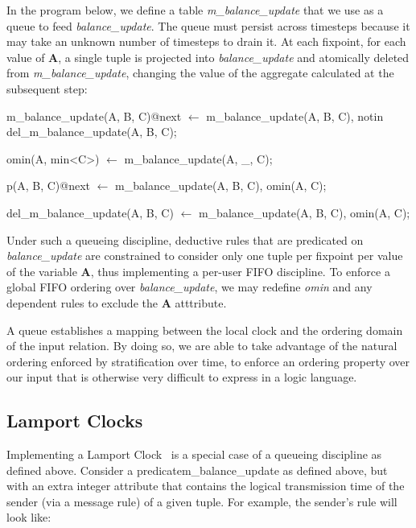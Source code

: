 In the program below, we define a table \emph{m\_balance\_update} that we use as a queue to feed \emph{balance\_update}.  The queue must persist across
timesteps because it may take an unknown number of timesteps to drain it.  At each fixpoint, for each value of \textbf{A}, a single
tuple is projected into \emph{balance\_update} and atomically deleted from \emph{m\_balance\_update}, changing the value of the aggregate calculated at the
subsequent step:


\begin{Dedalus}

m\_balance\_update(A, B, C)@next \(\leftarrow\)
  m\_balance\_update(A, B, C),
  notin del\_m\_balance\_update(A, B, C);

omin(A, min<C>) \(\leftarrow\)
  m\_balance_update(A, _, C);

p(A, B, C)@next \(\leftarrow\)
  m\_balance\_update(A, B, C),
  omin(A, C);

del\_m\_balance\_update(A, B, C) \(\leftarrow\)
  m\_balance\_update(A, B, C),
  omin(A, C);
\end{Dedalus}

Under such a queueing discipline, deductive rules that are predicated on \emph{balance\_update} are constrained to consider only one tuple per fixpoint
per value of the variable \textbf{A}, thus implementing a per-user FIFO discipline.  To enforce a global FIFO ordering over \emph{balance\_update}, 
we may redefine \emph{omin} and any dependent rules to exclude the \textbf{A} atttribute.

A queue establishes a mapping between the local clock and the ordering domain of the input relation. By doing so, we are able to take
advantage of the natural ordering enforced by stratification over time, to enforce an ordering property over our input that is otherwise 
very difficult to express in a logic language.

\subsection{Lamport Clocks}

Implementing a Lamport Clock~\cite{timeclocks} is a special case of a queueing discipline as defined above.
Consider a predicate{m\_balance\_update} as defined above, but with an extra integer attribute that contains the logical transmission
time of the sender (via a message rule) of a given tuple.  For example, the sender's rule will look like: 


